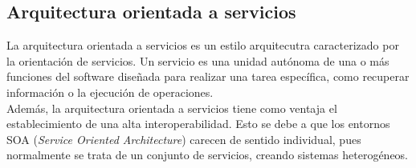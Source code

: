 \subsection{Arquitectura orientada a servicios}

La arquitectura orientada a servicios \cite{soa} es un estilo arquitecutra caracterizado por la orientación de servicios. Un servicio es una unidad autónoma de una o más funciones del software diseñada para realizar una tarea específica, como recuperar información o la ejecución de operaciones.
\\

Además, la arquitectura orientada a servicios tiene como ventaja el establecimiento de una alta interoperabilidad. Esto se debe a que los entornos SOA ({\it Service Oriented Architecture}) carecen de sentido individual, pues normalmente se trata de un conjunto de servicios, creando sistemas heterogéneos.